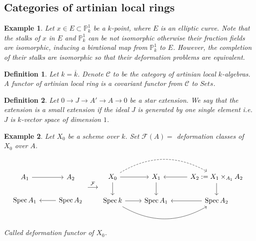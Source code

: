 \documentclass{ctexart}
\newtheorem{definition}{Definition}[section]
\newtheorem{example}{Example}[section]
\newcommand{\spec}{\operatorname{Spec}}
\begin{document}
\subsection{Categories of artinian local rings}
\label{subsection:Obstruction_Theory_of_Moduli_Space_Categories_of_artinian_local_rings}

\begin{example}
    Let $x\in E \subset \mathbb{P}_{k}^{1}$ be a $k$-point, where $E$ is an elliptic curve.
    Note that the stalks of $x$ in $E$ and $\mathbb{P}_{k}^{1}$ can be not isomorphic otherwise their fraction fields are isomorphic,
    inducing a birational map from $\mathbb{P}_{k}^{1}$ to $E$.
    However, the completion of their stalks are isomorphic so that their deformation problems are equivalent.
\end{example}
\begin{definition}
    Let $k = \overline{k}$.
    Denote $\mathcal{C}$ to be the category of artinian local $k$-algebras.
    A functor of artinian local ring is a covariant functor from $\mathcal{C}$ to $Sets$.
\end{definition}
\begin{definition}
    Let $0 \rightarrow J \rightarrow A' \rightarrow A \rightarrow 0$ be a star extension.
    We say that the extension is a small extension if the ideal $J$ is generated by one single element i.e. $J$ is $k$-vector space of dimension $1$.
\end{definition}
\begin{example}
    Let $X_{0}$ be a scheme over $k$.
    Set $\mathcal{F}(A) =$ deformation classes of $X_{0}$ over $A$.
    \begin{equation}
        \begin{tikzcd}
            A_{1} \arrow[r] &
            A_{2} \\
            \spec A_{1} &
            \spec A_{2} \arrow[l]
        \end{tikzcd}
        \overset{\mathcal{F}}{\longrightarrow}
        \begin{tikzcd}
            X_{0} \arrow[rr, dashrightarrow, bend left] \arrow[r] \arrow[d] &
            X_{1} \arrow[d] &
            X_{2} := X_{1} \times_{A_{1}} A_{2} \arrow[d] \arrow[l] \\
            \spec k \arrow[r] \arrow[rr, bend right] &
            \spec A_{1} &
            \spec A_{2} \arrow[l]
        \end{tikzcd}
    \end{equation}
    Called deformation functor of $X_{0}$.
    \label{example:deformation_functor_of_artinian_local_ring}
\end{example}
\end{document}
